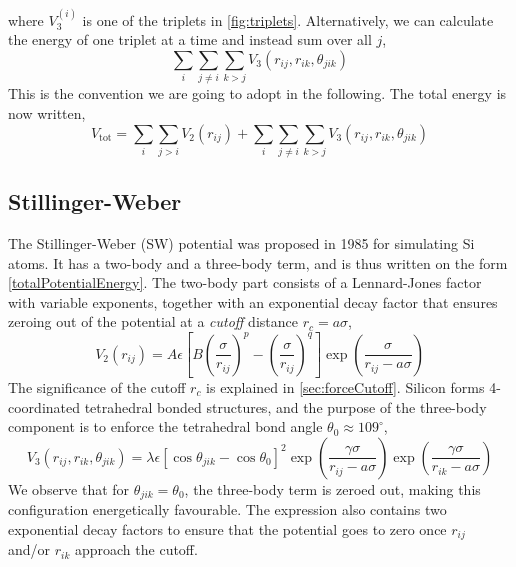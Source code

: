 \documentclass[twoside,english]{uiofysmaster}
\begin{document}
where $V_3^{(i)}$ is one of the triplets in \autoref{fig:triplets}. Alternatively, we can calculate the energy of one triplet 
at a time and instead sum over all $j$,
\begin{equation}
 \sum_{i}\sum_{j\neq i}\sum_{k>j} V_3 (r_{ij}, r_{ik}, \theta_{jik}) 
 \label{threeBodyPotentialEnergy2}
\end{equation}
This is the convention we are going to adopt in the following. 
The total energy is now written,
\begin{equation}
 V_{\mathrm{tot}} = \sum_i\sum_{j>i} V_2(r_{ij}) + \sum_{i}\sum_{j\neq i}\sum_{k>j} V_3 (r_{ij}, r_{ik}, \theta_{jik}) 
 \label{totalPotentialEnergy}
\end{equation}


\subsection{Stillinger-Weber} \label{sec:stillingerWeber}
The Stillinger-Weber (SW) potential was proposed in 1985 \cite{Stillinger85} for simulating Si atoms. It has a two-body
and a three-body term, and is thus written on the form \eqref{totalPotentialEnergy}. 
The two-body part consists of a Lennard-Jones factor with variable exponents, together with an exponential decay factor
that ensures zeroing out of the potential at a \textit{cutoff} distance $r_c = a\sigma$,
\begin{equation}
 V_2(r_{ij}) = A\epsilon\left[B\left(\frac{\sigma}{r_{ij}}\right)^p - 
 \left(\frac{\sigma}{r_{ij}}\right)^q\right] \exp\left(\frac{\sigma}{r_{ij} - a\sigma}\right)
 \label{StillingerWeber2Body}
\end{equation}
The significance of the cutoff $r_c$ is explained in \autoref{sec:forceCutoff}. 
Silicon forms 4-coordinated
tetrahedral bonded structures, and the purpose of the three-body component is to enforce the tetrahedral bond angle
$\theta_0 \approx 109^\circ$, 
\begin{equation}
 V_3(r_{ij}, r_{ik}, \theta_{jik}) = \lambda\epsilon[\cos\theta_{jik} - \cos\theta_0]^2
 \exp\left(\frac{\gamma\sigma}{r_{ij} - a\sigma}\right)\exp\left(\frac{\gamma\sigma}{r_{ik} - a\sigma}\right)
 \label{StillingerWeber3Body}
\end{equation}
We observe that for $\theta_{jik} = \theta_0$, the three-body term is zeroed out, making this configuration energetically 
favourable. The expression also contains two exponential decay factors to ensure that the potential goes 
to zero once $r_{ij}$ and/or $r_{ik}$ approach the cutoff. 
\end{document}
